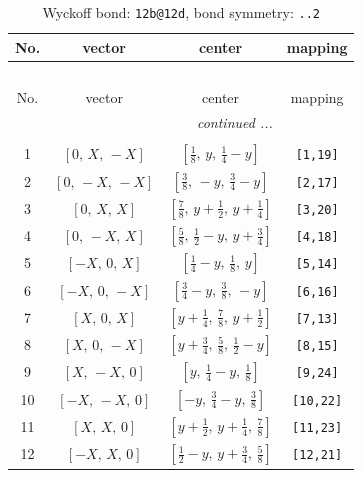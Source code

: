 \documentclass[fleqn,8pt]{jsarticle}
\begin{document}
\renewcommand{\arraystretch}{1.2}
\begin{longtable}{cccc}
\caption{Wyckoff bond: {\tt 12b@12d}, bond symmetry: {\tt ..2}}
 \\
 \hline \hline
No. & vector & center & mapping \\ \hline \endfirsthead

\multicolumn{3}{l}{\tablename\ \thetable{}} \\
 \hline \hline
No. & vector & center & mapping \\ \hline \endhead

 \hline \hline
\multicolumn{3}{r}{\footnotesize\it continued ...} \\ \endfoot

 \hline \hline
\multicolumn{3}{r}{} \\ \endlastfoot

1 & $\left[ 0,\, X,\, - X \right]$ & $\left[ \frac{1}{8},\, y,\, \frac{1}{4} - y \right]$ & {\tt [1,19]} \\ \hline
2 & $\left[ 0,\, - X,\, - X \right]$ & $\left[ \frac{3}{8},\, - y,\, \frac{3}{4} - y \right]$ & {\tt [2,17]} \\ \hline
3 & $\left[ 0,\, X,\, X \right]$ & $\left[ \frac{7}{8},\, y + \frac{1}{2},\, y + \frac{1}{4} \right]$ & {\tt [3,20]} \\ \hline
4 & $\left[ 0,\, - X,\, X \right]$ & $\left[ \frac{5}{8},\, \frac{1}{2} - y,\, y + \frac{3}{4} \right]$ & {\tt [4,18]} \\ \hline
5 & $\left[ - X,\, 0,\, X \right]$ & $\left[ \frac{1}{4} - y,\, \frac{1}{8},\, y \right]$ & {\tt [5,14]} \\ \hline
6 & $\left[ - X,\, 0,\, - X \right]$ & $\left[ \frac{3}{4} - y,\, \frac{3}{8},\, - y \right]$ & {\tt [6,16]} \\ \hline
7 & $\left[ X,\, 0,\, X \right]$ & $\left[ y + \frac{1}{4},\, \frac{7}{8},\, y + \frac{1}{2} \right]$ & {\tt [7,13]} \\ \hline
8 & $\left[ X,\, 0,\, - X \right]$ & $\left[ y + \frac{3}{4},\, \frac{5}{8},\, \frac{1}{2} - y \right]$ & {\tt [8,15]} \\ \hline
9 & $\left[ X,\, - X,\, 0 \right]$ & $\left[ y,\, \frac{1}{4} - y,\, \frac{1}{8} \right]$ & {\tt [9,24]} \\ \hline
10 & $\left[ - X,\, - X,\, 0 \right]$ & $\left[ - y,\, \frac{3}{4} - y,\, \frac{3}{8} \right]$ & {\tt [10,22]} \\ \hline
11 & $\left[ X,\, X,\, 0 \right]$ & $\left[ y + \frac{1}{2},\, y + \frac{1}{4},\, \frac{7}{8} \right]$ & {\tt [11,23]} \\ \hline
12 & $\left[ - X,\, X,\, 0 \right]$ & $\left[ \frac{1}{2} - y,\, y + \frac{3}{4},\, \frac{5}{8} \right]$ & {\tt [12,21]} \\
\end{longtable}
\end{document}

